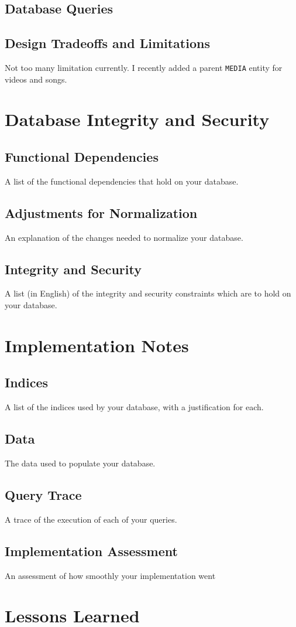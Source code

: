 \documentclass[11pt, a4paper]{report}
\begin{document}
\clearpage
\section{Database Queries}
    

\clearpage
\section{Design Tradeoffs and Limitations}
Not too many limitation currently. I recently added a parent \texttt{MEDIA} entity for videos and songs.

\chapter{Database Integrity and Security}
\section{Functional Dependencies}
    A list of the functional dependencies that hold on your database.
\section{Adjustments for Normalization}
    An explanation of the changes needed to normalize your database.
\section{Integrity and Security}
    A list (in English) of the integrity and security constraints which are to hold on your database.

\chapter{Implementation Notes}
\section{Indices}
    A list of the indices used by your database, with a justification for each.
\section{Data}
    The data used to populate your database.
\section{Query Trace}
    A trace of the execution of each of your queries.
\section{Implementation Assessment}
    An assessment of how smoothly your implementation went

\chapter{Lessons Learned}
\end{document}
